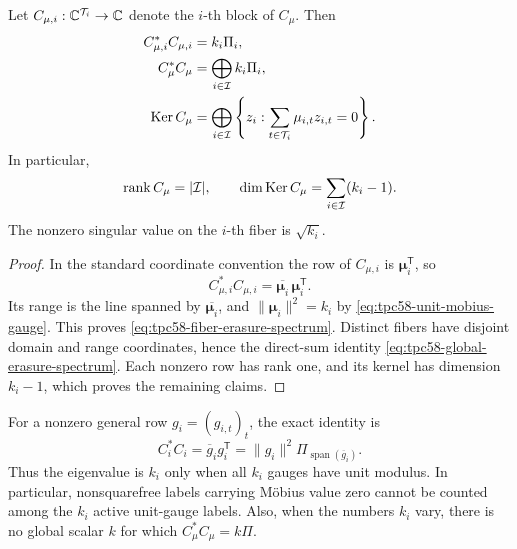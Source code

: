 \begin{theorem}
\label{thm:tpc58-exact-erasure-spectrum}
Let \(C_{\mu,i}:\mathbb C^{\mathcal T_i}\to\mathbb C\) denote the \(i\)-th block of
\(C_\mu\).  Then
\begin{align}
 C_{\mu,i}^*C_{\mu,i}&=k_i\Pi_i,
 \label{eq:tpc58-fiber-erasure-spectrum}\\
 C_\mu^*C_\mu&=\bigoplus_{i\in\mathcal I}k_i\Pi_i,
 \label{eq:tpc58-global-erasure-spectrum}\\
 \operatorname{Ker} C_\mu
 &=\bigoplus_{i\in\mathcal I}
   \left\{z_i:\sum_{t\in\mathcal T_i}\mu_{i,t}z_{i,t}=0\right\}.
 \label{eq:tpc58-exact-dark-space}
\end{align}
In particular,
\begin{equation}
 \operatorname{rank} C_\mu=|\mathcal I|,
 \qquad
 \dim\operatorname{Ker} C_\mu=\sum_{i\in\mathcal I}(k_i-1).
 \label{eq:tpc58-erasure-rank-nullity}
\end{equation}
The nonzero singular value on the \(i\)-th fiber is \(\sqrt{k_i}\).
\end{theorem}

\begin{proof}
In the standard coordinate convention the row of \(C_{\mu,i}\) is
\(\bm\mu_i^{\mathsf T}\), so
\begin{equation}
 C_{\mu,i}^*C_{\mu,i}
 =\overline{\bm\mu_i}\,\bm\mu_i^{\mathsf T}.
 \label{eq:tpc58-rank-one-outer-product}
\end{equation}
Its range is the line spanned by \(\overline{\bm\mu_i}\), and
\(\|\bm\mu_i\|^2=k_i\) by
\eqref{eq:tpc58-unit-mobius-gauge}.  This proves
\eqref{eq:tpc58-fiber-erasure-spectrum}.  Distinct fibers have disjoint
domain and range coordinates, hence the direct-sum identity
\eqref{eq:tpc58-global-erasure-spectrum}.  Each nonzero row has rank one,
and its kernel has dimension \(k_i-1\), which proves the remaining claims.
\end{proof}

\begin{remark}
\label{rem:tpc58-erasure-weight-scope}
For a nonzero general row \(g_i=(g_{i,t})_t\), the exact identity is
\begin{equation}
 C_i^*C_i
 =\overline g_i g_i^{\mathsf T}
 =\|g_i\|^2\Pi_{\operatorname{span}(\overline g_i)}.
 \label{eq:tpc58-general-erasure-row}
\end{equation}
Thus the eigenvalue is \(k_i\) only when all \(k_i\) gauges have unit
modulus.  In particular, nonsquarefree labels carrying M\"obius value zero
cannot be counted among the \(k_i\) active unit-gauge labels.  Also, when
the numbers \(k_i\) vary, there is no global scalar \(k\) for which
\(C_\mu^*C_\mu=k\Pi\).
\end{remark}

